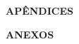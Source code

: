 \thispagestyle{empty}

\begin{flushleft}
\textbf{APÊNDICES}
\end{flushleft}

\newpage

\thispagestyle{empty}

\begin{flushleft}
\textbf{ANEXOS}
\end{flushleft}

